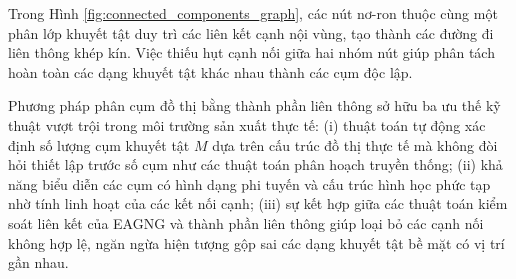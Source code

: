 Trong Hình \ref{fig:connected_components_graph}, các nút nơ-ron thuộc cùng một phân lớp khuyết tật duy trì các liên kết cạnh nội vùng, tạo thành các đường đi liên thông khép kín. Việc thiếu hụt cạnh nối giữa hai nhóm nút giúp phân tách hoàn toàn các dạng khuyết tật khác nhau thành các cụm độc lập.

Phương pháp phân cụm đồ thị bằng thành phần liên thông sở hữu ba ưu thế kỹ thuật vượt trội trong môi trường sản xuất thực tế:
(i) thuật toán tự động xác định số lượng cụm khuyết tật $M$ dựa trên cấu trúc đồ thị thực tế mà không đòi hỏi thiết lập trước số cụm như các thuật toán phân hoạch truyền thống;
(ii) khả năng biểu diễn các cụm có hình dạng phi tuyến và cấu trúc hình học phức tạp nhờ tính linh hoạt của các kết nối cạnh;
(iii) sự kết hợp giữa các thuật toán kiểm soát liên kết của EAGNG và thành phần liên thông giúp loại bỏ các cạnh nối không hợp lệ, ngăn ngừa hiện tượng gộp sai các dạng khuyết tật bề mặt có vị trí gần nhau.